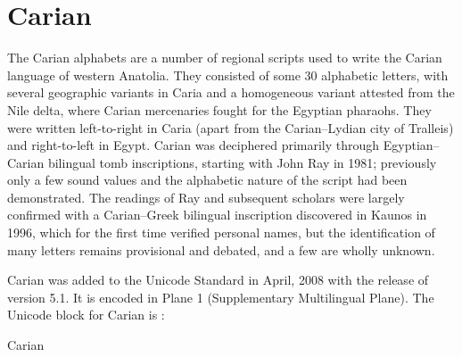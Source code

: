\section{Carian}
\label{sec:carian}
The Carian alphabets are a number of regional scripts used to write the Carian language of western Anatolia. They consisted of some 30 alphabetic letters, with several geographic variants in Caria and a homogeneous variant attested from the Nile delta, where Carian mercenaries fought for the Egyptian pharaohs. They were written left-to-right in Caria (apart from the Carian–Lydian city of Tralleis) and right-to-left in Egypt. Carian was deciphered primarily through Egyptian–Carian bilingual tomb inscriptions, starting with John Ray in 1981; previously only a few sound values and the alphabetic nature of the script had been demonstrated. The readings of Ray and subsequent scholars were largely confirmed with a Carian–Greek bilingual inscription discovered in Kaunos in 1996, which for the first time verified personal names, but the identification of many letters remains provisional and debated, and a few are wholly unknown.

Carian was added to the Unicode Standard in April, 2008 with the release of version 5.1. It is encoded in Plane 1 (Supplementary Multilingual Plane).
The Unicode block for Carian is :

\begin{scriptexample}[]{Carian}
\end{scriptexample}





